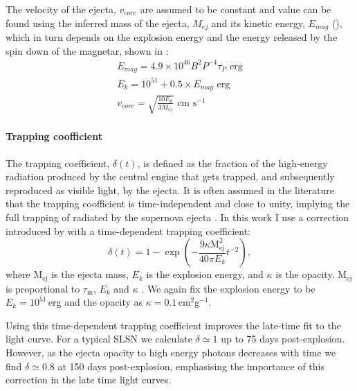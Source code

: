 The velocity of the ejecta, $v_{core}$ are assumed to be constant and value can be found using the inferred mass of the ejecta, $M_{ej}$ and its kinetic energy, $E_{mag}$ (), which in turn depends on the explosion energy and the energy released by the spin down of the magnetar, shown in :
\begin{align}
\label{Eq:Emag}
E_{mag} = 4.9\times10^{46} B^2 P^{-4} \tau_{P}  \text{ erg} \\
E_k = 10^{51} + 0.5 \times E_{mag} \text{ erg}\\
\label{Eq:vcore}
v_{core} =  \sqrt{\frac{10 E_{k}}{3 M_{ej}}} \text{ cm s}^{-1}
\end{align}

\paragraph{Trapping coofficient}
The trapping coefficient, $\delta(t)$, is defined as the fraction of the high-energy radiation produced by the central engine that gets trapped, and subsequently reproduced as visible light, by the ejecta. It is often assumed in the literature that the trapping coofficient is time-independent and close to unity, implying the full trapping of radiated by the supernova ejecta \citep{Inserra2013,Papadopuplus2014,Nicoll2015}. In this work I use a correction introduced by \cite{Wang2015} with a time-dependent trapping coefficient:
\begin{equation}
\delta(t) = 1 - \exp\left({-\frac{9\kappa \mathrm{M}_{\mathrm{ej}}^{2}}{40\pi  E_k} t^{-2}} \right),
\label{Eq:Wang}
\end{equation}
\noindent where $\mathrm{M}_{\mathrm{ej}}$ is the ejecta mass, $E_k$ is the explosion energy, and $\kappa$ is the opacity. $\mathrm{M}_{\mathrm{ej}}$ is proportional to $\tau_\mathrm{m}$, $E_k$ and $\kappa$ \citep{Inserra2013}. We again fix the explosion energy to be $E_k = 10^{51}$\,erg and the opacity as $\kappa = 0.1$\,cm$^2$g$^{-1}$.

Using this time-dependent trapping coefficient improves the late-time fit to the light curve. For a typical SLSN we calculate $\delta \simeq 1$ up to 75 days post-explosion. However, as the ejecta opacity to high energy photons decreases with time we find $\delta \simeq 0.8$ at 150 days post-explosion, emphasising the importance of this correction in the late time light curves.

